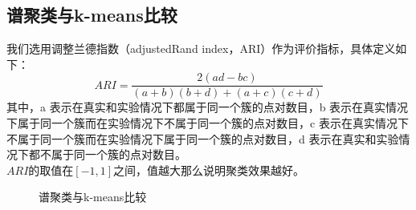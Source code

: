 \documentclass[11pt]{scrartcl}
\begin{document}
\subsection{谱聚类与k-means比较}
我们选用调整兰德指数（adjustedRand index，ARI）作为评价指标，具体定义如下：
$$
ARI=\frac{2(ad-bc)}{(a+b)(b+d)+(a+c)(c+d)}
$$
其中，a 表示在真实和实验情况下都属于同一个簇的点对数目，b 表示在真实情况下属于同一个簇而在实验情况下不属于同一个簇的点对数目，c 表示在真实情况下不属于同一个簇而在实验情况下属于同一个簇的点对数目，d 表示在真实和实验情况下都不属于同一个簇的点对数目。\\
$ARI$的取值在$[-1,1]$之间，值越大那么说明聚类效果越好。





\begin{figure}[htbp]
\centering
{}
\quad
{}
\quad
{}

\caption{谱聚类与k-means比较}
\end{figure}
\end{document}
